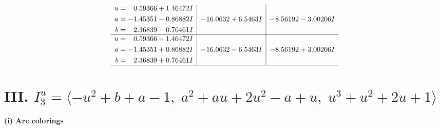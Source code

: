 \documentclass[1p]{elsarticle_modified}
\theoremstyle{definition}
\begin{document}
$$\begin{array}{c|c|c}
\begin{aligned}
u &= \phantom{-}0.59366 + 1.46472 I \\
a &= -1.45351 - 0.86882 I \\
b &= \phantom{-}2.36839 - 0.76461 I\end{aligned}
 & -16.0632 + 6.5463 I & -8.56192 - 3.00206 I \\ \hline\begin{aligned}
u &= \phantom{-}0.59366 - 1.46472 I \\
a &= -1.45351 + 0.86882 I \\
b &= \phantom{-}2.36839 + 0.76461 I\end{aligned}
 & -16.0632 - 6.5463 I & -8.56192 + 3.00206 I\\
 \hline 
 \end{array}$$\newpage\newpage\renewcommand{\arraystretch}{1}
\centering \section*{III. $I^u_{3}= \langle - u^2+b+a-1,\;a^2+a u+2 u^2- a+u,\;u^3+u^2+2 u+1 \rangle$}
\flushleft \textbf{(i) Arc colorings}\\
\end{document}
